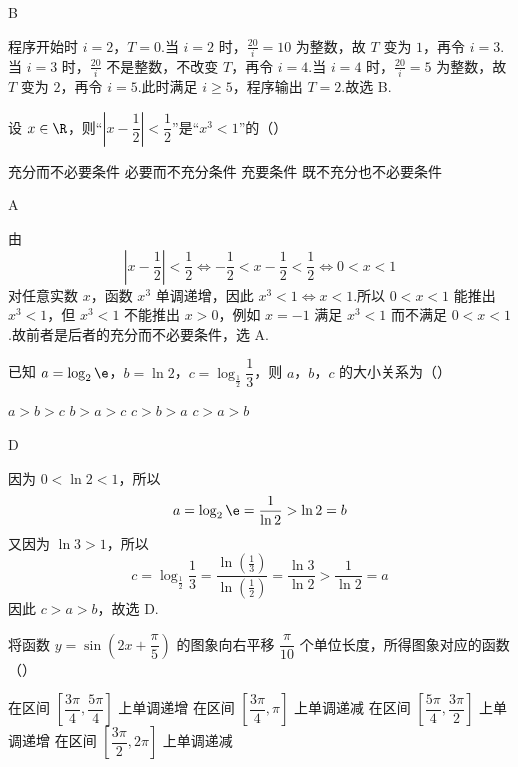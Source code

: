 \begin{answer}
B
\end{answer}

\begin{solution}
程序开始时 \(i=2\)，\(T=0\).当 \(i=2\) 时，\(\frac{20}{i}=10\) 为整数，故 \(T\) 变为 \(1\)，再令 \(i=3\).当 \(i=3\) 时，\(\frac{20}{i}\) 不是整数，不改变 \(T\)，再令 \(i=4\).当 \(i=4\) 时，\(\frac{20}{i}=5\) 为整数，故 \(T\) 变为 \(2\)，再令 \(i=5\).此时满足 \(i\ge5\)，程序输出 \(T=2\).故选 B.
\end{solution}

\begin{problem}
设 \(x\in\R\)，则“\(\left\lvert x-\dfrac12\right\rvert<\dfrac12\)”是“\(x^3<1\)”的（\quad）

\choices
    {充分而不必要条件}
    {必要而不充分条件}
    {充要条件}
    {既不充分也不必要条件}
\end{problem}

\begin{answer}
A
\end{answer}

\begin{solution}
由
\[
\left\lvert x-\frac12\right\rvert<\frac12
\Longleftrightarrow -\frac12<x-\frac12<\frac12
\Longleftrightarrow 0<x<1
\]
对任意实数 \(x\)，函数 \(x^3\) 单调递增，因此 \(x^3<1\Longleftrightarrow x<1\).所以 \(0<x<1\) 能推出 \(x^3<1\)，但 \(x^3<1\) 不能推出 \(x>0\)，例如 \(x=-1\) 满足 \(x^3<1\) 而不满足 \(0<x<1\).故前者是后者的充分而不必要条件，选 A.
\end{solution}

\begin{problem}
已知 \(a=\log_2\e\)，\(b=\ln2\)，\(c=\log_{\frac12}\dfrac13\)，则 \(a\)，\(b\)，\(c\) 的大小关系为（\quad）

\choices
    {\(a>b>c\)}
    {\(b>a>c\)}
    {\(c>b>a\)}
    {\(c>a>b\)}
\end{problem}

\begin{answer}
D
\end{answer}

\begin{solution}
因为 \(0<\ln2<1\)，所以
\[
a=\log_2\e=\frac1{\ln2}>\ln2=b
\]
又因为 \(\ln3>1\)，所以
\[
c=\log_{\frac12}\frac13
 =\frac{\ln(\frac{1}{3})}{\ln(\frac{1}{2})}
 =\frac{\ln3}{\ln2}>\frac1{\ln2}=a
\]
因此 \(c>a>b\)，故选 D.
\end{solution}

\begin{problem}
将函数 \(y=\sin\left(2x+\dfrac{\pi}{5}\right)\) 的图象向右平移 \(\dfrac{\pi}{10}\) 个单位长度，所得图象对应的函数（\quad）

\choices
    {在区间 \(\left[\dfrac{3\pi}{4},\dfrac{5\pi}{4}\right]\) 上单调递增}
    {在区间 \(\left[\dfrac{3\pi}{4},\pi\right]\) 上单调递减}
    {在区间 \(\left[\dfrac{5\pi}{4},\dfrac{3\pi}{2}\right]\) 上单调递增}
    {在区间 \(\left[\dfrac{3\pi}{2},2\pi\right]\) 上单调递减}
\end{problem}

